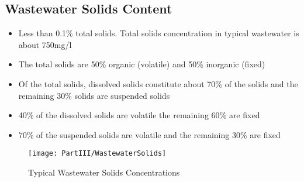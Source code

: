 	\subsection{Wastewater Solids Content}			
			\begin{itemize}
				\item Less than 0.1\% total solids.  Total solids concentration in typical wastewater is about 750mg/l
				\item The total solids are 50\% organic (volatile) and 50\% inorganic (fixed)
				\item Of the total solids, dissolved solids constitute about 70\% of the solids and the remaining 30\% solids are suspended solids
				\item 40\% of the dissolved solids are volatile the remaining 60\% are fixed
				\item 70\% of the suspended solids are volatile and the remaining 30\% are fixed
			\end{itemize}
			\newpage
			\begin{landscape}
			\begin{figure}[!htbp]
			\vspace{2cm}
				\begin{center}
					\texttt{[image: PartIII/WastewaterSolids]}\\
					\caption{Typical Wastewater Solids Concentrations}
				\end{center}
				\end{figure}
			\end{landscape}
				

